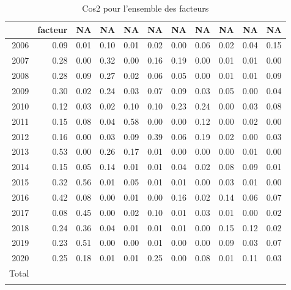 \begin{longtable}{rrrrrrrrrrr}
  \hline
 & facteur & NA & NA & NA & NA & NA & NA & NA & NA & NA \\ 
  \hline
 2006 & 0.09 & 0.01 & 0.10 & 0.01 & 0.02 & 0.00 & 0.06 & 0.02 & 0.04 & 0.15 \\ 
   2007 & 0.28 & 0.00 & 0.32 & 0.00 & 0.16 & 0.19 & 0.00 & 0.01 & 0.01 & 0.00 \\ 
   2008 & 0.28 & 0.09 & 0.27 & 0.02 & 0.06 & 0.05 & 0.00 & 0.01 & 0.01 & 0.09 \\ 
   2009 & 0.30 & 0.02 & 0.24 & 0.03 & 0.07 & 0.09 & 0.03 & 0.05 & 0.00 & 0.04 \\ 
   2010 & 0.12 & 0.03 & 0.02 & 0.10 & 0.10 & 0.23 & 0.24 & 0.00 & 0.03 & 0.08 \\ 
   2011 & 0.15 & 0.08 & 0.04 & 0.58 & 0.00 & 0.00 & 0.12 & 0.00 & 0.02 & 0.00 \\ 
   2012 & 0.16 & 0.00 & 0.03 & 0.09 & 0.39 & 0.06 & 0.19 & 0.02 & 0.00 & 0.03 \\ 
   2013 & 0.53 & 0.00 & 0.26 & 0.17 & 0.01 & 0.00 & 0.00 & 0.00 & 0.01 & 0.00 \\ 
   2014 & 0.15 & 0.05 & 0.14 & 0.01 & 0.01 & 0.04 & 0.02 & 0.08 & 0.09 & 0.01 \\ 
   2015 & 0.32 & 0.56 & 0.01 & 0.05 & 0.01 & 0.01 & 0.00 & 0.03 & 0.01 & 0.00 \\ 
   2016 & 0.42 & 0.08 & 0.00 & 0.01 & 0.00 & 0.16 & 0.02 & 0.14 & 0.06 & 0.07 \\ 
   2017 & 0.08 & 0.45 & 0.00 & 0.02 & 0.10 & 0.01 & 0.03 & 0.01 & 0.00 & 0.02 \\ 
   2018 & 0.24 & 0.36 & 0.04 & 0.01 & 0.01 & 0.01 & 0.00 & 0.15 & 0.12 & 0.02 \\ 
   2019 & 0.23 & 0.51 & 0.00 & 0.00 & 0.01 & 0.00 & 0.00 & 0.09 & 0.03 & 0.07 \\ 
   2020 & 0.25 & 0.18 & 0.01 & 0.01 & 0.25 & 0.00 & 0.08 & 0.01 & 0.11 & 0.03 \\ 
  Total &  &  &  &  &  &  &  &  &  &  \\ 
   \hline
\hline
\caption{Cos2 pour l'ensemble des facteurs} 
\end{longtable}
